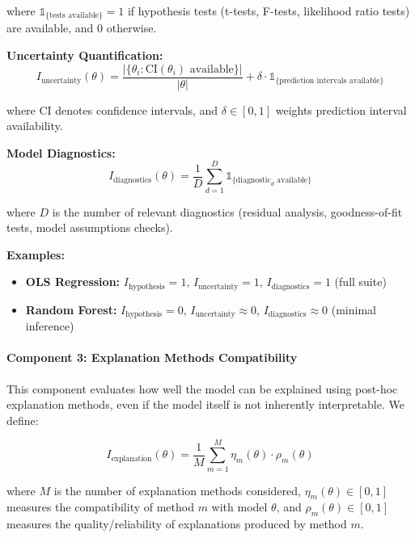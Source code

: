 \documentclass[11pt,a4paper]{article}
\begin{document}
where $\mathbb{1}_{\{\text{tests available}\}} = 1$ if hypothesis tests (t-tests, F-tests, likelihood ratio tests) are available, and $0$ otherwise.

\textbf{Uncertainty Quantification:}
\begin{equation}
I_{\text{uncertainty}}(\theta) = \frac{|\{\theta_i : \text{CI}(\theta_i) \text{ available}\}|}{|\theta|} + \delta \cdot \mathbb{1}_{\{\text{prediction intervals available}\}}
\end{equation}

where CI denotes confidence intervals, and $\delta \in [0, 1]$ weights prediction interval availability.

\textbf{Model Diagnostics:}
\begin{equation}
I_{\text{diagnostics}}(\theta) = \frac{1}{D} \sum_{d=1}^{D} \mathbb{1}_{\{\text{diagnostic}_d \text{ available}\}}
\end{equation}

where $D$ is the number of relevant diagnostics (residual analysis, goodness-of-fit tests, model assumptions checks).

\textbf{Examples:}
\begin{itemize}
    \item \textbf{OLS Regression:} $I_{\text{hypothesis}} = 1$, $I_{\text{uncertainty}} = 1$, $I_{\text{diagnostics}} = 1$ (full suite)
    \item \textbf{Random Forest:} $I_{\text{hypothesis}} = 0$, $I_{\text{uncertainty}} \approx 0$, $I_{\text{diagnostics}} \approx 0$ (minimal inference)
\end{itemize}

\paragraph{Component 3: Explanation Methods Compatibility}

This component evaluates how well the model can be explained using post-hoc explanation methods, even if the model itself is not inherently interpretable. We define:

\begin{equation}
I_{\text{explanation}}(\theta) = \frac{1}{M} \sum_{m=1}^{M} \eta_m(\theta) \cdot \rho_m(\theta)
\label{eq:explanation}
\end{equation}

where $M$ is the number of explanation methods considered, $\eta_m(\theta) \in [0,1]$ measures the compatibility of method $m$ with model $\theta$, and $\rho_m(\theta) \in [0,1]$ measures the quality/reliability of explanations produced by method $m$.
\end{document}

